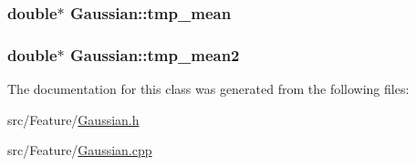 \hypertarget{class_gaussian_a2cb98c41e2ef235cc797dde7eaf82ff0}{
\subsubsection[{tmp\+\_\+mean}]{\setlength{\rightskip}{0pt plus 5cm}double$\ast$ Gaussian\+::tmp\+\_\+mean\hspace{0.3cm}{\ttfamily [private]}}}\label{class_gaussian_a2cb98c41e2ef235cc797dde7eaf82ff0}
\hypertarget{class_gaussian_a116f6507f12be2f0d560016740e005f0}{
\subsubsection[{tmp\+\_\+mean2}]{\setlength{\rightskip}{0pt plus 5cm}double$\ast$ Gaussian\+::tmp\+\_\+mean2\hspace{0.3cm}{\ttfamily [private]}}}\label{class_gaussian_a116f6507f12be2f0d560016740e005f0}


The documentation for this class was generated from the following files\+:\begin{DoxyCompactItemize}
\item 
src/\+Feature/\hyperlink{_gaussian_8h}{Gaussian.\+h}\item 
src/\+Feature/\hyperlink{_gaussian_8cpp}{Gaussian.\+cpp}\end{DoxyCompactItemize}
